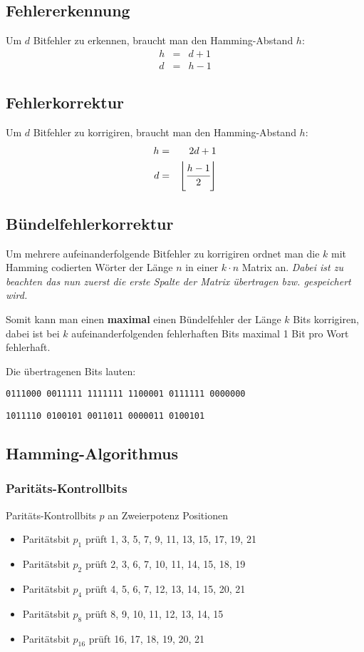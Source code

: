 \subsection{Fehlererkennung}
Um $d$ Bitfehler zu erkennen, braucht man den Hamming-Abstand $h$:
\begin{eqnarray*}
    h &=& d + 1 \\
    d &=& h - 1
\end{eqnarray*}

\subsection{Fehlerkorrektur}
Um $d$ Bitfehler zu korrigiren, braucht man den Hamming-Abstand $h$:
\begin{eqnarray*}
    h &=& 2d + 1 \\
    d &=& \left\lfloor\cfrac{h - 1}{2}\right\rfloor
\end{eqnarray*}

\subsection{Bündelfehlerkorrektur}
Um mehrere aufeinanderfolgende Bitfehler zu korrigiren ordnet man die $k$ mit Hamming
codierten Wörter der Länge $n$ in einer $k \cdot n$ Matrix an. \emph{Dabei ist zu 
beachten das nun zuerst die erste Spalte der Matrix übertragen bzw. gespeichert wird.}\par
Somit kann man einen \textbf{maximal} einen Bündelfehler der Länge $k$ Bits korrigiren,
dabei ist bei $k$ aufeinanderfolgenden fehlerhaften Bits maximal 1 Bit pro Wort fehlerhaft.

\example
{}
Die übertragenen Bits lauten:\par
\texttt{0111000 0011111 1111111 1100001 0111111 0000000}\par
\texttt{1011110 0100101 0011011 0000011 0100101}

\subsection{Hamming-Algorithmus}
\subsubsection*{Paritäts-Kontrollbits}
Paritäts-Kontrollbits $p$ an Zweierpotenz Positionen
\begin{itemize}
    \item Paritätsbit $p_{1}$ prüft 1, 3, 5, 7, 9, 11, 13, 15, 17, 19, 21
    \item Paritätsbit $p_{2}$ prüft 2, 3, 6, 7, 10, 11, 14, 15, 18, 19
    \item Paritätsbit $p_{4}$ prüft 4, 5, 6, 7, 12, 13, 14, 15, 20, 21
    \item Paritätsbit $p_{8}$ prüft 8, 9, 10, 11, 12, 13, 14, 15
    \item Paritätsbit $p_{16}$ prüft 16, 17, 18, 19, 20, 21
\end{itemize}

